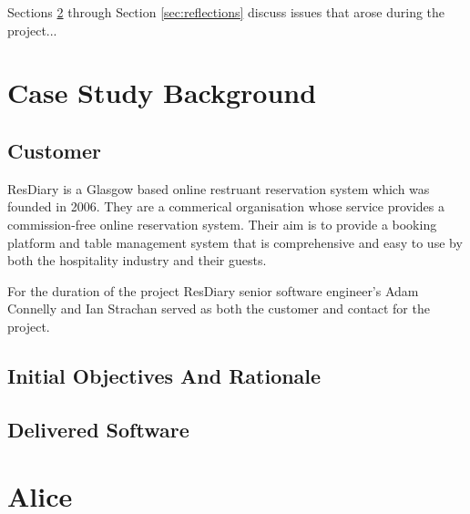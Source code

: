 \documentclass{l3proj}
\begin{document}
Sections \ref{sec:alice} through Section \ref{sec:reflections} discuss issues that arose during the project...

\newpage

\section{Case Study Background}
\label{sec:background}

\subsection{Customer}
\label{customer}
ResDiary is a Glasgow based online restruant reservation system which was founded in 2006. They are a commerical organisation whose service provides a commission-free online reservation system. Their aim is to provide a booking platform and table management system that is comprehensive and easy to use by both the hospitality industry and their guests. 

For the duration of the project ResDiary senior software engineer's Adam Connelly and Ian Strachan served as both the customer and contact for the project. 

\subsection{Initial Objectives And Rationale}
\label{initobjectives}

\subsection{Delivered Software}
\label{finsoftware}

\newpage

\section{Alice}
\label{sec:alice}
\end{document}
